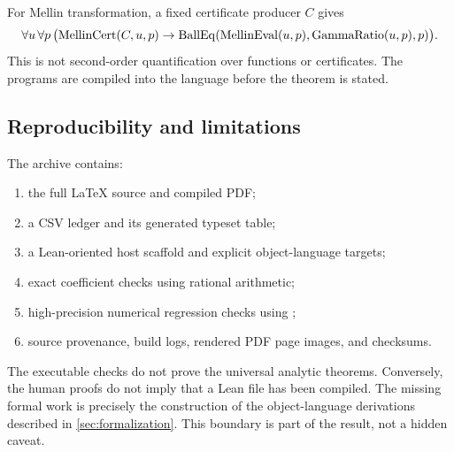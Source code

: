 For Mellin transformation, a fixed certificate producer $C$ gives
\[
 \forall u\,\forall p\,
 \bigl(\operatorname{MellinCert}(C,u,p)\to
 \operatorname{BallEq}(\operatorname{MellinEval}(u,p),
         \operatorname{GammaRatio}(u,p),p)\bigr).
\]
This is not second-order quantification over functions or certificates.  The
programs are compiled into the language before the theorem is stated.

\subsection{Reproducibility and limitations}

The archive contains:
\begin{enumerate}
\item the full LaTeX source and compiled PDF;
\item a CSV ledger and its generated typeset table;
\item a Lean-oriented host scaffold and explicit object-language targets;
\item exact coefficient checks using rational arithmetic;
\item high-precision numerical regression checks using ;
\item source provenance, build logs, rendered PDF page images, and checksums.
\end{enumerate}

The executable checks do not prove the universal analytic theorems.  Conversely,
the human proofs do not imply that a Lean file has been compiled.  The missing
formal work is precisely the construction of the object-language derivations
described in \cref{sec:formalization}.  This boundary is part of the result,
not a hidden caveat.

